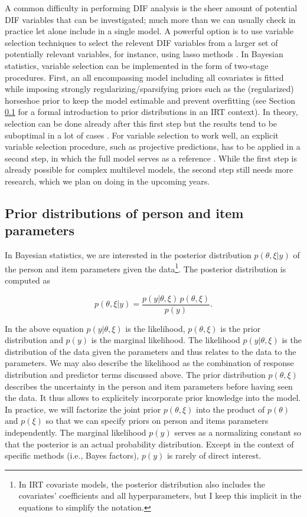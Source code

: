 \documentclass[
]{jss}
\begin{document}
A common difficulty in performing DIF analysis is the sheer amount of
potential DIF variables that can be investigated; much more than we can
usually check in practice let alone include in a single model. A
powerful option is to use variable selection techniques to select the
relevent DIF variables from a larger set of potentially relevant
variables, for instance, using lasso methods \citep{schauberger2019}. In
Bayesian statistics, variable selection can be implemented in the form
of two-stage procedures. First, an all encompassing model including all
covariates is fitted while imposing strongly regularizing/sparsifying
priors such as the (regularized) horseshoe prior
\citep{carvalho2010, piironen2017} to keep the model estimable and
prevent overfitting (see Section \ref{priors} for a formal introduction
to prior distributions in an IRT context). In theory, selection can be
done already after this first step but the results tend to be suboptimal
in a lot of cases \citep{piironen2017comparison}. For variable selection
to work well, an explicit variable selection procedure, such as
projective predictions, has to be applied in a second step, in which the
full model serves as a reference \citep{piironen2017comparison}. While
the first step is already possible for complex multilevel models, the
second step still needs more research, which we plan on doing in the
upcoming years.

\hypertarget{priors}{%
\subsection{Prior distributions of person and item
parameters}\label{priors}}

In Bayesian statistics, we are interested in the posterior distribution
\(p(\theta, \xi | y)\) of the person and item parameters given the
data\footnote{In IRT covariate models, the posterior distribution also includes
the covariates' coefficients and all hyperparameters, but I keep this implicit
in the equations to simplify the notation.}. The posterior distribution
is computed as

\[
p(\theta, \xi | y) = \frac{p(y | \theta, \xi) \, p(\theta, \xi)}{p(y)}.
\]

In the above equation \(p(y | \theta, \xi)\) is the likelihood,
\(p(\theta, \xi)\) is the prior distribution and \(p(y)\) is the
marginal likelihood. The likelihood \(p(y | \theta, \xi)\) is the
distribution of the data given the parameters and thus relates to the
data to the parameters. We may also describe the likelihood as the
combination of response distribution and predictor terms discussed
above. The prior distribution \(p(\theta, \xi)\) describes the
uncertainty in the person and item parameters before having seen the
data. It thus allows to explicitely incorporate prior knowledge into the
model. In practice, we will factorize the joint prior \(p(\theta, \xi)\)
into the product of \(p(\theta)\) and \(p(\xi)\) so that we can specify
priors on person and items parameters independently. The marginal
likelihood \(p(y)\) serves as a normalizing constant so that the
posterior is an actual probability distribution. Except in the context
of specific methods (i.e., Bayes factors), \(p(y)\) is rarely of direct
interest.
\end{document}
